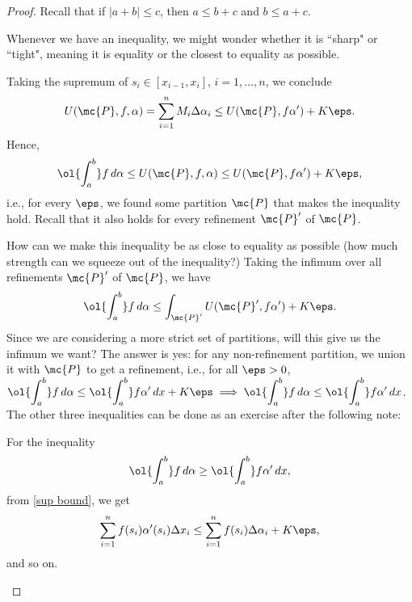 \begin{proof}
	\medskip
	
	Recall that if \(|a+b|\leq c\), then \(a\leq b+c\) and \(b\leq a+c\).
	\begin{note}
		Whenever we have an inequality, we might wonder whether it is ``sharp" or ``tight", meaning it is equality or the closest to equality as possible.
	\end{note}
	
	Taking the supremum of \(s_i\in[x_{i-1},x_i]\), \(i=1,\dots, n\), we conclude 
	\begin{equation*}
		U(\mc{P},f,\alpha)=\sum_{i=1}^n M_i\Delta\alpha_i\leq U(\mc{P},f\alpha')+K\eps.
	\end{equation*}
	Hence, 
	\begin{equation*}
		\ol{\int_a^b}f \, d\alpha\leq U(\mc{P},f,\alpha)\leq U(\mc{P},f\alpha')+K\eps,
	\end{equation*}
	i.e., for every \(\eps\), we found some partition \(\mc{P}\) that makes the inequality hold. Recall that it also holds for every refinement \(\mc{P}'\) of \(\mc{P}\).
	
	\medskip
	
	How can we make this inequality be as close to equality as possible (how much strength can we squeeze out of the inequality?) Taking the infimum over all refinements \(\mc{P}'\) of \(\mc{P}\), we have 
	\begin{equation*}
		\ol{\int_a^b}f \, d\alpha\leq \int_{\mc{P}'} U(\mc{P}',f\alpha')+K\eps.
	\end{equation*}
	Since we are considering a more strict set of partitions, will this give us the infimum we want? The answer is yes: for any non-refinement partition, we union it with \(\mc{P}\) to get a refinement, i.e., for all \(\eps>0\), \(\displaystyle\ol{\int_a^b}f \, d\alpha\leq \ol{\int_a^b}f \alpha' \, dx+K\eps\implies \ol{\int_a^b}f \, d\alpha\leq \ol{\int_a^b}f \alpha' \, dx\). The other three inequalities can be done as an exercise after the following note:
	\begin{note}
		For the inequality 
		\begin{equation*}
			\ol{\int_a^b}f \, d\alpha\geq \ol{\int_a^b}f \alpha' \, dx,
		\end{equation*}
		from \cref{sup bound}, we get 
		\begin{equation*}
			\sum_{i=1}^nf(s_i)\alpha'(s_i)\Delta x_i\leq \sum_{i=1}^n f(s_i)\Delta\alpha_i+K\eps,
		\end{equation*}
		and so on.
	\end{note}
\end{proof}